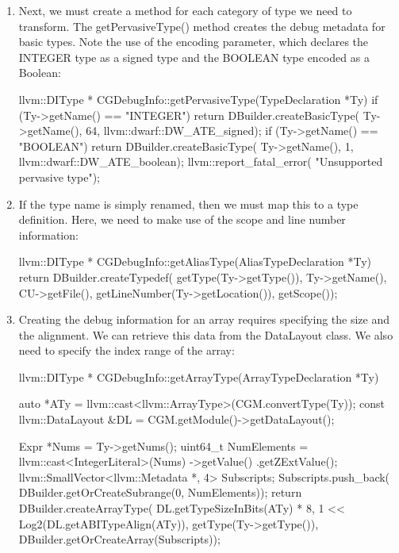 \begin{enumerate}
\item
Next, we must create a method for each category of type we need to transform. The getPervasiveType() method creates the debug metadata for basic types. Note the use of the encoding parameter, which declares the INTEGER type as a signed type and the BOOLEAN type encoded as a Boolean:

\begin{cpp}
llvm::DIType *
CGDebugInfo::getPervasiveType(TypeDeclaration *Ty) {
    if (Ty->getName() == "INTEGER") {
        return DBuilder.createBasicType(
            Ty->getName(), 64, llvm::dwarf::DW_ATE_signed);
    }
    if (Ty->getName() == "BOOLEAN") {
        return DBuilder.createBasicType(
            Ty->getName(), 1, llvm::dwarf::DW_ATE_boolean);
    }
    llvm::report_fatal_error(
        "Unsupported pervasive type");
}
\end{cpp}

\item
If the type name is simply renamed, then we must map this to a type definition. Here, we need to make use of the scope and line number information:

\begin{cpp}
llvm::DIType *
CGDebugInfo::getAliasType(AliasTypeDeclaration *Ty) {
    return DBuilder.createTypedef(
        getType(Ty->getType()), Ty->getName(),
        CU->getFile(), getLineNumber(Ty->getLocation()),
        getScope());
}
\end{cpp}

\item
Creating the debug information for an array requires specifying the size and the alignment. We can retrieve this data from the DataLayout class. We also need to specify the index range of the array:

\begin{cpp}
llvm::DIType *
CGDebugInfo::getArrayType(ArrayTypeDeclaration *Ty) {
    auto *ATy =
        llvm::cast<llvm::ArrayType>(CGM.convertType(Ty));
    const llvm::DataLayout &DL =
        CGM.getModule()->getDataLayout();

    Expr *Nums = Ty->getNums();
    uint64_t NumElements =
        llvm::cast<IntegerLiteral>(Nums)
            ->getValue()
            .getZExtValue();
    llvm::SmallVector<llvm::Metadata *, 4> Subscripts;
    Subscripts.push_back(
        DBuilder.getOrCreateSubrange(0, NumElements));
    return DBuilder.createArrayType(
        DL.getTypeSizeInBits(ATy) * 8,
        1 << Log2(DL.getABITypeAlign(ATy)),
        getType(Ty->getType()),
        DBuilder.getOrCreateArray(Subscripts));
}
\end{cpp}


\end{enumerate}

